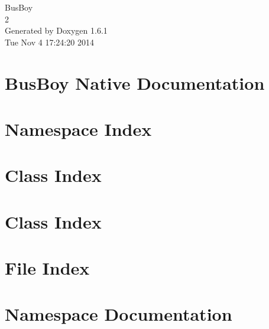 \documentclass[a4paper]{book}
\begin{document}
\hypersetup{pageanchor=false}
\begin{titlepage}
\vspace*{7cm}
\begin{center}
{\Large BusBoy \\[1ex]\large 2 }\\
\vspace*{1cm}
{\large Generated by Doxygen 1.6.1}\\
\vspace*{0.5cm}
{\small Tue Nov 4 17:24:20 2014}\\
\end{center}
\end{titlepage}
\clearemptydoublepage
{}
\tableofcontents
\clearemptydoublepage
{}
\hypersetup{pageanchor=true}
\chapter{BusBoy Native Documentation}
\label{index}\hypertarget{index}{}
\chapter{Namespace Index}

\chapter{Class Index}

\chapter{Class Index}

\chapter{File Index}

\chapter{Namespace Documentation}

\end{document}
